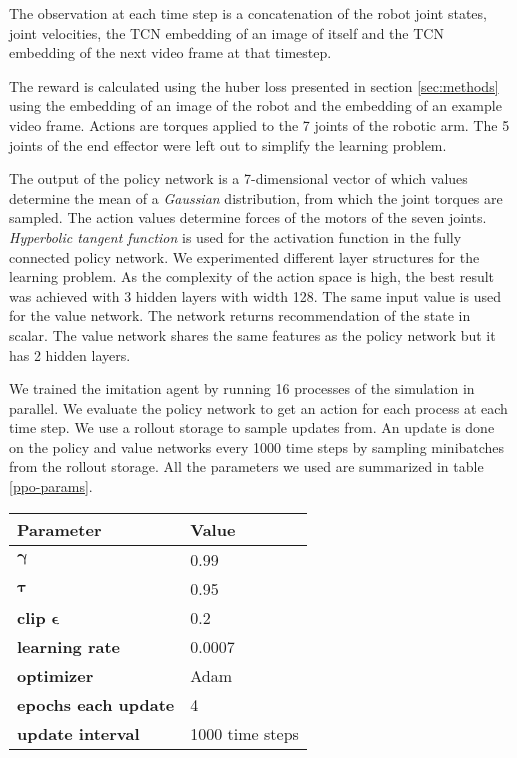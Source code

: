 The observation at each time step is a concatenation of the robot joint states, joint velocities, the TCN embedding of an image of itself and the TCN embedding of the next video frame at that timestep.

The reward is calculated using the huber loss presented in section \ref{sec:methods} using the embedding of an image of the robot and the embedding of an example video frame. Actions are torques applied to the 7 joints of the robotic arm. The 5 joints of the end effector were left out to simplify the learning problem.

The output of the policy network is a 7-dimensional vector of which values determine the mean of a \textit{Gaussian} distribution, from which the joint torques are sampled. The action values determine forces of the motors of the seven joints. \textit{Hyperbolic tangent function} is used for the activation function in the fully connected policy network. We experimented different layer structures for the learning problem. As the complexity of the action space is high, the best result was achieved with 3 hidden layers with width 128. The same input value is used for the value network. The network returns recommendation of the state in scalar. The value network shares the same features as the policy network but it has 2 hidden layers.

We trained the imitation agent by running 16 processes of the simulation in parallel. We evaluate the policy network to get an action for each process at each time step. We use a rollout storage to sample updates from. An update is done on the policy and value networks every 1000 time steps by sampling minibatches from the rollout storage. All the parameters we used are summarized in table \ref{ppo-params}.

{
    \vspace{0.5cm}
    \centering
    \begin{tabular}{@{}ll@{}}
    \toprule
    \textbf{Parameter}             & \textbf{Value}    \\ \midrule
    $\boldsymbol{\gamma}$        & 0.99                \\
    $\boldsymbol{\tau}$        & 0.95                \\
    \textbf{clip} $\boldsymbol{\epsilon}$        & 0.2                \\
    \textbf{learning rate}                       & 0.0007 \\
    \textbf{optimizer}                        & Adam \\
    \textbf{epochs each update}        & 4                \\
    \textbf{update interval}        & 1000 time steps                \\
    \end{tabular}
    \label{ppo-params}
}

